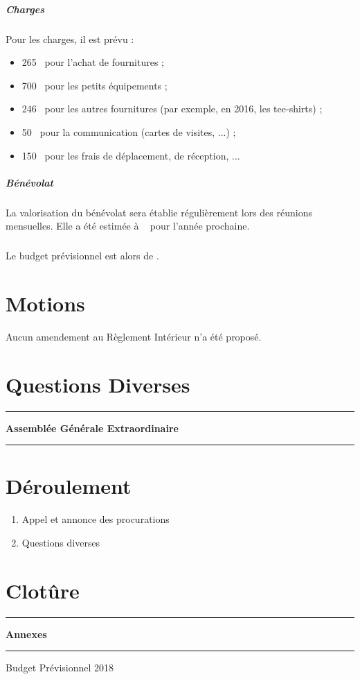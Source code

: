 \documentclass[11pt]{article}
\begin{document}
\subparagraph{Charges}
Pour les charges, il est prévu :
\begin{itemize}
 \item 265\officialeuro~ pour l'achat de fournitures ;
 \item 700\officialeuro~ pour les petits équipements ;
 \item 246\officialeuro~ pour les autres fournitures (par exemple, en 2016, les tee-shirts) ;
 \item 50\officialeuro~ pour la communication (cartes de visites, ...) ;
 \item 150\officialeuro~ pour les frais de déplacement, de réception, ...
\end{itemize}

\subparagraph{Bénévolat}La valorisation du bénévolat sera établie régulièrement lors des réunions mensuelles.
Elle a été estimée à \officialeuro~ pour l'année prochaine.

\subparagraph{}Le budget prévisionnel est alors de \officialeuro.

\section{Motions}
Aucun amendement au Règlement Intérieur n'a été proposé.

\section{Questions Diverses}

\newpage

\hrule
\vspace{.3cm}
\begin{center}
\Large\bfseries Assemblée Générale Extraordinaire
\end{center}
\vspace{.3cm}
\hrule

\vspace{1.5cm}

\section*{Déroulement}

\begin{enumerate}
    \item Appel et annonce des procurations
		\item Questions diverses
\end{enumerate}

\section*{Clotûre}

\newpage

\clearpage
\thispagestyle{empty}
\vspace*{\fill}
\begin{center}
\hrule
\vspace{.3cm}
\Huge\bfseries Annexes
\vspace{.3cm}
\hrule
\vspace{2cm}
\Large
\noindent Budget Prévisionnel 2018
\end{center}
\vspace*{\fill}


\end{document}
